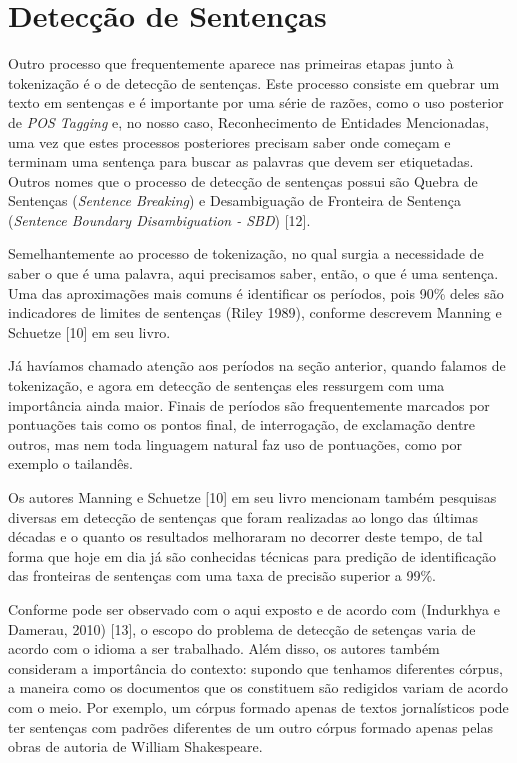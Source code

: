 \documentclass[11pt]{report}
\begin{document}
\section{Detecção de Sentenças}

\indent\indent Outro processo que frequentemente aparece nas primeiras etapas junto à tokenização é o de detecção de sentenças. Este processo consiste em
quebrar um texto em sentenças e é importante por uma série de razões, como o uso posterior de \textit{POS Tagging} e, no nosso caso, Reconhecimento de Entidades Mencionadas, uma
vez que estes processos posteriores precisam saber onde começam e terminam uma sentença para buscar as palavras que devem ser etiquetadas. Outros nomes que o processo de
detecção de sentenças possui são Quebra de Sentenças (\textit{Sentence Breaking}) e Desambiguação de Fronteira de Sentença (\textit{Sentence Boundary Disambiguation - SBD}) [12].

Semelhantemente ao processo de tokenização, no qual surgia a necessidade de saber o que é uma palavra, aqui precisamos saber, então, o que é uma sentença. Uma das aproximações
mais comuns é identificar os períodos, pois 90\% deles são indicadores de limites de sentenças (Riley 1989), conforme descrevem Manning e Schuetze [10] em seu livro.

Já havíamos chamado atenção aos períodos na seção anterior, quando falamos de tokenização, e agora em detecção de sentenças eles ressurgem com uma importância ainda maior. Finais de
períodos são frequentemente marcados por pontuações tais como os pontos final, de interrogação, de exclamação dentre outros, mas nem toda linguagem natural faz uso
de pontuações, como por exemplo o tailandês.

Os autores Manning e Schuetze [10] em seu livro mencionam também pesquisas diversas em detecção de sentenças que foram realizadas ao longo das últimas décadas e o quanto
os resultados melhoraram no decorrer deste tempo, de tal forma que hoje em dia já são conhecidas técnicas para predição de identificação das fronteiras de sentenças com uma
taxa de precisão superior a 99\%.

Conforme pode ser observado com o aqui exposto e de acordo com (Indurkhya e Damerau, 2010) [13], o escopo do problema de detecção de setenças varia de acordo com o idioma
a ser trabalhado. Além disso, os autores também consideram a importância do contexto: supondo que tenhamos diferentes córpus, a maneira como os documentos que os
constituem são redigidos variam de acordo com o meio. Por exemplo, um córpus formado apenas de textos jornalísticos pode ter sentenças com padrões diferentes de um outro
córpus formado apenas pelas obras de autoria de William Shakespeare.
\end{document}
